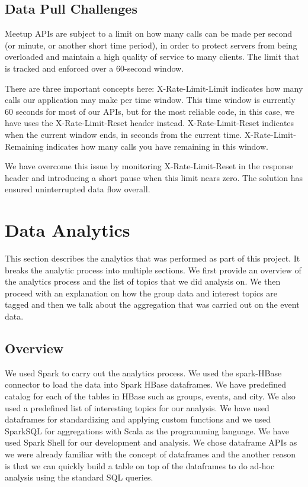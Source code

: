 \documentclass{acm_proc_article-sp}
\begin{document}
\subsection{Data Pull Challenges}
Meetup APIs are subject to a limit on how many calls can be made per second (or minute, or another short time period), in order to protect servers from being overloaded and maintain a high quality of service to many clients. The limit that is tracked and enforced over a 60-second window. 

There are three important concepts here:
X-Rate-Limit-Limit \cite{www-data-pull-challenges} indicates how many calls our application may make per time window. This time window is currently 60 seconds for most of our APIs, but for the most reliable code, in this case, we have  uses the X-Rate-Limit-Reset header instead. X-Rate-Limit-Reset indicates when the current window ends, in seconds from the current time. X-Rate-Limit-Remaining indicates how many calls you have remaining in this window.

We have overcome this issue by monitoring X-Rate-Limit-Reset in the response header and introducing a short pause when this limit nears zero. The solution has ensured uninterrupted data flow overall.

\section{Data Analytics}
This section describes the analytics that was performed as part of this project.  It breaks the analytic process into multiple sections.  We first provide an overview of the analytics process and the list of topics that we did analysis on.  We then proceed with an explanation on how the group data and interest topics are tagged and then we talk about the aggregation that was carried out on the event data. 

\subsection{Overview}
We used Spark to carry out the analytics process.  We used the spark-HBase connector to load the data into Spark HBase dataframes.  We have predefined catalog for each of the tables in HBase such as groups, events, and city.  We also used a predefined list of interesting topics for our analysis.  We have used dataframes for standardizing and applying custom functions and we used SparkSQL for aggregations with Scala as the programming language.  We have used Spark Shell for our development and analysis.  We chose dataframe APIs as we were already familiar with the concept of dataframes and the another reason is that we can quickly build a table on top of the dataframes to do ad-hoc analysis using the standard SQL queries.
\end{document}
